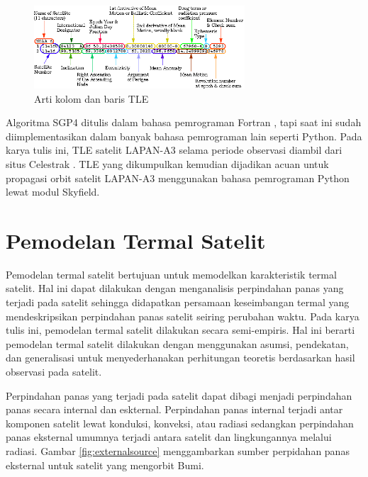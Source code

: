 \begin{figure}[H]
\setlength{}
\begin{center}
\includegraphics[width=0.7\textwidth]{fig/tlemeaning.png}
	\caption[Arti kolom dan baris TLE]{Arti kolom dan baris TLE~\cite{2011}}
\label{fig:tlemeaning}
\end{center}
\end{figure}

Algoritma SGP4 ditulis dalam bahasa pemrograman Fortran \cite{vallado2006},
tapi saat ini sudah diimplementasikan dalam banyak bahasa pemrograman lain
seperti Python. Pada karya tulis ini, TLE satelit LAPAN-A3 selama periode
observasi diambil dari situs Celestrak \cite{kelso}. TLE yang dikumpulkan
kemudian dijadikan acuan untuk propagasi orbit satelit LAPAN-A3 menggunakan
bahasa pemrograman Python lewat modul Skyfield.

\section{Pemodelan Termal Satelit}

Pemodelan termal satelit bertujuan untuk memodelkan karakteristik termal
satelit. Hal ini dapat dilakukan dengan menganalisis perpindahan panas yang
terjadi pada satelit sehingga didapatkan persamaan keseimbangan termal yang
mendeskripsikan perpindahan panas satelit seiring perubahan waktu. Pada karya
tulis ini, pemodelan termal satelit dilakukan secara semi-empiris. Hal ini
berarti pemodelan termal satelit dilakukan dengan menggunakan asumsi,
pendekatan, dan generalisasi untuk menyederhanakan perhitungan teoretis
berdasarkan hasil observasi pada satelit.

Perpindahan panas yang terjadi pada satelit dapat dibagi menjadi perpindahan
panas secara internal dan eskternal. Perpindahan panas internal terjadi antar
komponen satelit lewat konduksi, konveksi, atau radiasi sedangkan perpindahan
panas eksternal umumnya terjadi antara satelit dan lingkungannya melalui
radiasi. Gambar \ref{fig:externalsource} menggambarkan sumber
perpidahan panas eksternal untuk satelit yang mengorbit Bumi.

